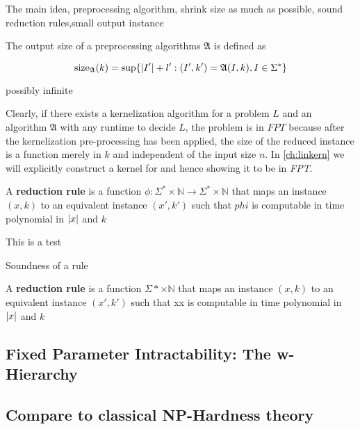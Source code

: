 The main idea, preprocessing algorithm, shrink size as much as possible, sound reduction rules,small output instance

\begin{definition} The output size of a preprocessing algorithms $\mathfrak{A}$ is defined as 

    \[\mathrm{size}_{\mathfrak{A}}(k) = \sup\{\abs{I'} + l': (I',k')= \mathfrak{A}(I,k), I \in \Sigma^* \} \]
\end{definition}

possibly infinite

Clearly, if there exists a kernelization algorithm for a problem $L$ and an algorithm $\mathfrak{A}$ with any runtime to decide $L$, the problem is in $FPT$ because after the kernelization pre-processing has been applied, the size of the reduced instance is a function merely in $k$ and independent of the input size $n$. In \cref{ch:linkern} we will explicitly construct a kernel for \psdom and hence showing it to be in \textit{FPT}. 


\begin{definition}
A \textbf{reduction rule} is a function $\phi:\Sigma^* \times \mathbb{N} \rightarrow \Sigma^* \times \mathbb{N}$ that maps an instance $(x,k)$ to an equivalent instance $(x',k')$ such that $phi$ is computable in time polynomial in $\abs{x}$ and $k$
\end{definition}

\begin{definition}
     This is a test
\end{definition}

\begin{definition}{Soundness of a rule}

\end{definition}

A \textbf{reduction rule} is a function $\Sigma* \times \mathbb{N}$ that maps an instance $(x,k)$ to an equivalent instance $(x',k')$ such that xx is computable in time polynomial in $\abs{x}$ and $k$

\subsection{Fixed Parameter Intractability: The w-Hierarchy}
\subsection{Compare to classical NP-Hardness theory}

